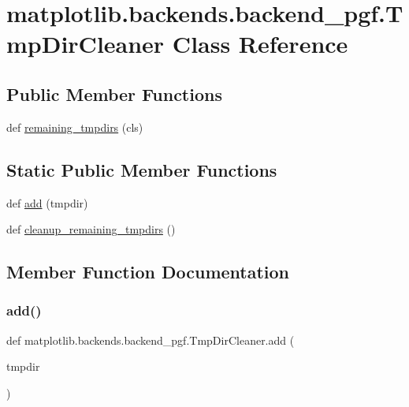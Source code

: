 \hypertarget{classmatplotlib_1_1backends_1_1backend__pgf_1_1TmpDirCleaner}{}\section{matplotlib.\+backends.\+backend\+\_\+pgf.\+Tmp\+Dir\+Cleaner Class Reference}
\label{classmatplotlib_1_1backends_1_1backend__pgf_1_1TmpDirCleaner}
\subsection*{Public Member Functions}
\begin{DoxyCompactItemize}
\item 
def \hyperlink{classmatplotlib_1_1backends_1_1backend__pgf_1_1TmpDirCleaner_ae2994dc0bf3dbc927f9b5966b44d041d}{remaining\+\_\+tmpdirs} (cls)
\end{DoxyCompactItemize}
\subsection*{Static Public Member Functions}
\begin{DoxyCompactItemize}
\item 
def \hyperlink{classmatplotlib_1_1backends_1_1backend__pgf_1_1TmpDirCleaner_aed1cd90b94af38359f903043d768d92b}{add} (tmpdir)
\item 
def \hyperlink{classmatplotlib_1_1backends_1_1backend__pgf_1_1TmpDirCleaner_a28413648ce9acb5db4c36cbc59dca9af}{cleanup\+\_\+remaining\+\_\+tmpdirs} ()
\end{DoxyCompactItemize}


\subsection{Member Function Documentation}
\mbox{\label{classmatplotlib_1_1backends_1_1backend__pgf_1_1TmpDirCleaner_aed1cd90b94af38359f903043d768d92b}} 
\subsubsection{\texorpdfstring{add()}{add()}}
{\footnotesize\ttfamily def matplotlib.\+backends.\+backend\+\_\+pgf.\+Tmp\+Dir\+Cleaner.\+add (\begin{DoxyParamCaption}\item[{}]{tmpdir }\end{DoxyParamCaption})\hspace{0.3cm}{\ttfamily [static]}}

